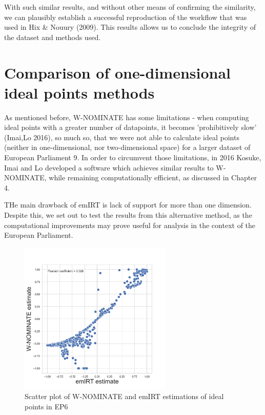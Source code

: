 \documentclass[a4paper,12pt]{report}
\begin{document}
    With such similar results, and without other means of confirming the similarity, we can plausibly
    establish a successful reproduction of the workflow that was used in Hix & Nouury (2009). This
    results allows us to conclude the integrity of the dataset and methods used.


    \section{Comparison of one-dimensional ideal points methods}
    \label{sec:comparison-of-one-dimensional-ideal-points-methods}
    As mentioned before, W-NOMINATE has some limitations - when computing ideal points with a greater number
    of datapoints, it becomes 'prohibitively slow' (Imai,Lo 2016), so much so, that we were not able to
    calculate ideal points (neither in one-dimensional, nor two-dimensional space) for a larger dataset of
    European Parliament 9. In order to circumvent those limitations,
    in 2016 Kosuke, Imai and Lo developed a software which achieves similar results to W-NOMINATE, while
    remaining computationally efficient, as discussed in Chapter 4.

    THe main drawback of emIRT is lack of support for more than one dimension. Despite this, we set out to
    test the results from this alternative method, as the computational improvements may prove useful for analysis
    in the context of the European Parliament.
    \begin{figure}[H]
        \centering
        \includegraphics[width=0.65\textwidth]{Graphs/ScatterWNOMINATE_6}
        \caption{Scatter plot of W-NOMINATE and emIRT estimations of ideal points in EP6}
        \label{fig:WNOMINATE_SCATTER_6}
    \end{figure}
\end{document}
